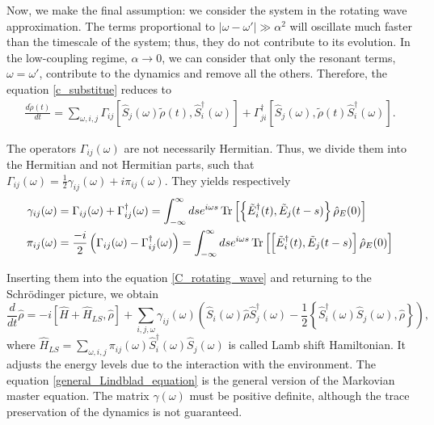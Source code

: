 Now, we make the final assumption: we consider the system in the rotating wave approximation. The terms proportional to $|\omega-\omega'| \gg \alpha^2$ will oscillate much faster than the timescale of the system; thus, they do not contribute to its evolution. In the low-coupling regime, $\alpha\rightarrow 0$, we can consider that only the resonant terms, $\omega=\omega'$, contribute to the dynamics and remove all the others. Therefore, the equation \eqref{c_substitue} reduces to
\begin{eqnarray}\label{C_rotating_wave}
    \frac{d\tilde\rho(t)}{dt} = \sum_{\omega,i,j}\Gamma_{ij}\left[\hat S_j(\omega)\tilde\rho(t),\hat S_i^\dagger(\omega)\right]+\Gamma_{ji}^\dagger\left[\hat S_j(\omega),\tilde\rho(t)\hat S_i^\dagger(\omega)\right].
\end{eqnarray}

The operators $\Gamma_{ij}(\omega)$ are not necessarily Hermitian. Thus, we divide them into the Hermitian and not Hermitian parts, such that $\Gamma_{ij}(\omega) =\frac{1}{2}\gamma_{ij}(\omega)+i\pi_{ij}(\omega)$. They yields respectively
\begin{equation}
    \begin{split}
        \gamma_{ij}(\omega) &=   \Gamma_{ij}(\omega) + \Gamma_{ij}^\dagger(\omega) = \int_{-\infty}^\infty ds e^{i\omega s}\operatorname{Tr}\left[\left\{\tilde E_i^\dagger(t),\tilde E_j(t-s)\right\}\hat\rho_E(0)\right]\\
        \pi_{ij}(\omega) &= \frac{-i}{2}\left(\Gamma_{ij}(\omega)-\Gamma_{ij}^\dagger(\omega)\right)=\int_{-\infty}^\infty ds e^{i\omega s}\operatorname{Tr}\left[\left[\tilde E_i^\dagger(t),\tilde E_j(t-s)\right]\hat\rho_E(0)\right]\\
    \end{split}
\end{equation}

Inserting them into the equation \eqref{C_rotating_wave} and returning to the Schrödinger picture, we obtain
\begin{equation}\label{general_Lindblad_equation}
    \frac{d}{dt}\hat\rho = -i\left[\hat H + \hat H_{LS},\hat\rho\right] + \sum_{i,j,\omega} \gamma_{ij}(\omega) \left(\hat S_i(\omega) \hat\rho \hat S^\dagger_j(\omega) - \frac{1}{2}\left\{ \hat S^\dagger_i(\omega)\hat S_j(\omega), \hat\rho\right\} \right),
\end{equation}
where $\hat H_{LS} = \sum_{\omega,i,j} \pi_{ij}(\omega)\hat S^\dagger_i(\omega)\hat S_j(\omega)$ is called Lamb shift Hamiltonian. It adjusts the energy levels due to the interaction with the environment. The equation \eqref{general_Lindblad_equation} is the general version of the Markovian master equation. The matrix $\gamma(\omega)$ must be positive definite, although the trace preservation of the dynamics is not guaranteed.

